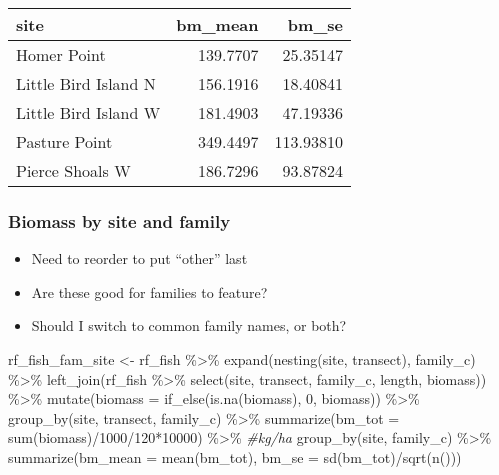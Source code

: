 \documentclass[
]{article}
\newenvironment{Shaded}{\begin{snugshade}}{\end{snugshade}}
\newcommand{\AttributeTok}[1]{\textcolor[rgb]{0.77,0.63,0.00}{#1}}
\newcommand{\CommentTok}[1]{\textcolor[rgb]{0.56,0.35,0.01}{\textit{#1}}}
\newcommand{\DecValTok}[1]{\textcolor[rgb]{0.00,0.00,0.81}{#1}}
\newcommand{\FunctionTok}[1]{\textcolor[rgb]{0.00,0.00,0.00}{#1}}
\newcommand{\NormalTok}[1]{#1}
\newcommand{\OtherTok}[1]{\textcolor[rgb]{0.56,0.35,0.01}{#1}}
\newcommand{\SpecialCharTok}[1]{\textcolor[rgb]{0.00,0.00,0.00}{#1}}
\providecommand{\tightlist}{%
  \setlength{\itemsep}{0pt}\setlength{\parskip}{0pt}}
\begin{document}
\begin{longtable}[]{@{}lrr@{}}
\toprule()
site & bm\_mean & bm\_se \\
\midrule()
\endhead
Homer Point & 139.7707 & 25.35147 \\
Little Bird Island N & 156.1916 & 18.40841 \\
Little Bird Island W & 181.4903 & 47.19336 \\
Pasture Point & 349.4497 & 113.93810 \\
Pierce Shoals W & 186.7296 & 93.87824 \\
\bottomrule()
\end{longtable}

\hypertarget{biomass-by-site-and-family}{%
\subsubsection{Biomass by site and
family}\label{biomass-by-site-and-family}}

\begin{itemize}
\tightlist
\item
  Need to reorder to put ``other'' last
\item
  Are these good for families to feature?
\item
  Should I switch to common family names, or both?
\end{itemize}

\begin{Shaded}
\begin{Highlighting}[]
\NormalTok{rf\_fish\_fam\_site }\OtherTok{\textless{}{-}}\NormalTok{ rf\_fish }\SpecialCharTok{\%\textgreater{}\%} 
  \FunctionTok{expand}\NormalTok{(}\FunctionTok{nesting}\NormalTok{(site, transect), family\_c) }\SpecialCharTok{\%\textgreater{}\%}
  \FunctionTok{left\_join}\NormalTok{(rf\_fish }\SpecialCharTok{\%\textgreater{}\%}
      \FunctionTok{select}\NormalTok{(site, transect, family\_c, length, biomass)) }\SpecialCharTok{\%\textgreater{}\%}
  \FunctionTok{mutate}\NormalTok{(}\AttributeTok{biomass =} \FunctionTok{if\_else}\NormalTok{(}\FunctionTok{is.na}\NormalTok{(biomass), }\DecValTok{0}\NormalTok{, biomass)) }\SpecialCharTok{\%\textgreater{}\%}
  \FunctionTok{group\_by}\NormalTok{(site, transect, family\_c) }\SpecialCharTok{\%\textgreater{}\%}
  \FunctionTok{summarize}\NormalTok{(}\AttributeTok{bm\_tot =} \FunctionTok{sum}\NormalTok{(biomass)}\SpecialCharTok{/}\DecValTok{1000}\SpecialCharTok{/}\DecValTok{120}\SpecialCharTok{*}\DecValTok{10000}\NormalTok{) }\SpecialCharTok{\%\textgreater{}\%} \CommentTok{\#kg/ha}
  \FunctionTok{group\_by}\NormalTok{(site, family\_c) }\SpecialCharTok{\%\textgreater{}\%}
  \FunctionTok{summarize}\NormalTok{(}\AttributeTok{bm\_mean =} \FunctionTok{mean}\NormalTok{(bm\_tot),}
            \AttributeTok{bm\_se =} \FunctionTok{sd}\NormalTok{(bm\_tot)}\SpecialCharTok{/}\FunctionTok{sqrt}\NormalTok{(}\FunctionTok{n}\NormalTok{()))}
\end{Highlighting}
\end{Shaded}
\end{document}
